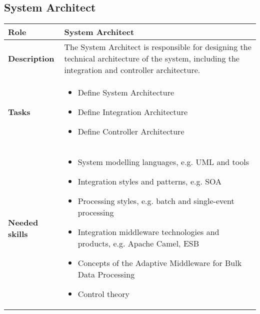 \subsection{System Architect} 
\begin{minipage}{\textwidth}
\label{table:ch6_Role_System_Architect}
\begin{tabular}
	{|m{2cm}|m{10cm}|} \hline \bfseries Role & System Architect\\
	\hline \bfseries Description & The System Architect is responsible for designing the technical architecture of the system, including the integration and controller architecture.\\
	\hline \bfseries Tasks & 
	\begin{itemize}
		\item Define System Architecture 
		\item Define Integration Architecture
		\item Define Controller Architecture
	\end{itemize}
	\\
	\hline
	\bfseries Needed skills & 
	\begin{itemize}
		\item System modelling languages, e.g. \ac{UML} and tools
		\item Integration styles and patterns, e.g. \ac{SOA}
		\item Processing styles, e.g. batch and single-event processing
		\item Integration middleware technologies and products, e.g. Apache Camel, \ac{ESB}
		\item Concepts of the Adaptive Middleware for Bulk Data Processing
		\item Control theory
	\end{itemize}
	\\
	\hline
\end{tabular}
\end{minipage}

